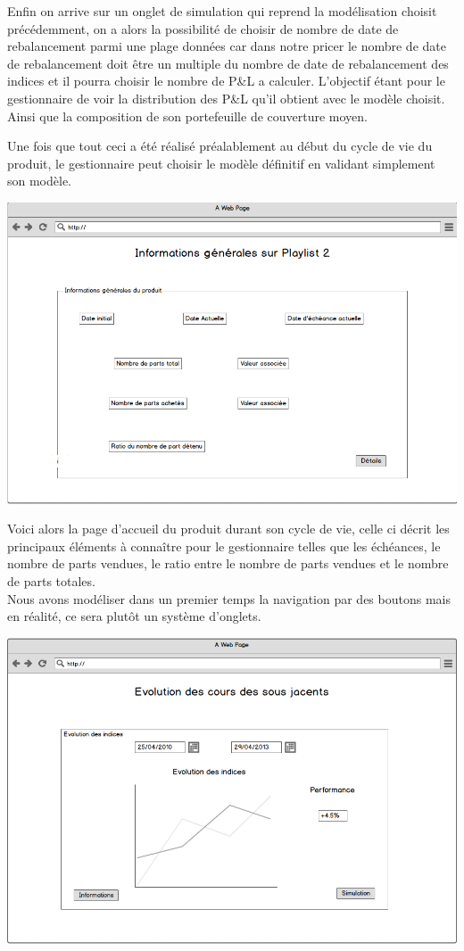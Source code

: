 \documentclass[french,12pt,a4paper]{article}
\begin{document}
Enfin on arrive sur un onglet de simulation qui reprend la modélisation choisit précédemment, on a alors la possibilité de choisir de nombre de date de rebalancement parmi une plage données car dans notre pricer le nombre de date de rebalancement  doit être un multiple du nombre de date de rebalancement des indices et il pourra choisir le nombre de P&L a calculer. L'objectif étant pour le gestionnaire de voir la distribution des P&L qu'il obtient avec le modèle choisit. Ainsi que la composition de son portefeuille de couverture moyen.

Une fois que tout ceci a été réalisé préalablement au début du cycle de vie du produit, le gestionnaire peut choisir le modèle définitif en validant simplement son modèle.


\begin{center}
\includegraphics[scale=0.4]{../Maquette_1.png}
\end{center}


Voici alors la page d'accueil du produit durant son cycle de vie, celle ci décrit les principaux éléments à connaître pour le gestionnaire telles que les échéances, le nombre de parts vendues, le ratio entre le nombre de parts vendues et le nombre de parts totales. \\
Nous avons modéliser dans un premier temps la navigation par des boutons mais en réalité, ce sera plutôt un système d'onglets.


\begin{center}
\includegraphics[scale=0.4]{../Maquette_2.png}
\end{center}
\end{document}
